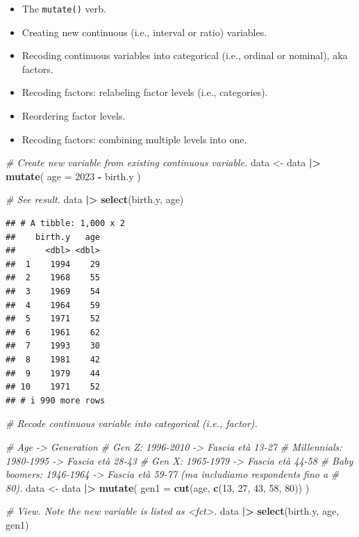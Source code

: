 \documentclass[
]{book}
\newenvironment{Shaded}{\begin{snugshade}}{\end{snugshade}}
\newcommand{\AttributeTok}[1]{\textcolor[rgb]{0.13,0.29,0.53}{#1}}
\newcommand{\CommentTok}[1]{\textcolor[rgb]{0.56,0.35,0.01}{\textit{#1}}}
\newcommand{\DecValTok}[1]{\textcolor[rgb]{0.00,0.00,0.81}{#1}}
\newcommand{\FunctionTok}[1]{\textcolor[rgb]{0.13,0.29,0.53}{\textbf{#1}}}
\newcommand{\NormalTok}[1]{#1}
\newcommand{\OtherTok}[1]{\textcolor[rgb]{0.56,0.35,0.01}{#1}}
\newcommand{\SpecialCharTok}[1]{\textcolor[rgb]{0.81,0.36,0.00}{\textbf{#1}}}
\providecommand{\tightlist}{%
  \setlength{\itemsep}{0pt}\setlength{\parskip}{0pt}}
\begin{document}
\begin{itemize}
\tightlist
\item
  The \texttt{mutate()} verb.
\item
  Creating new continuous (i.e., interval or ratio) variables.
\item
  Recoding continuous variables into categorical (i.e., ordinal or nominal), aka factors.
\item
  Recoding factors: relabeling factor levels (i.e., categories).
\item
  Reordering factor levels.
\item
  Recoding factors: combining multiple levels into one.
\end{itemize}

\begin{Shaded}
\begin{Highlighting}[]
\CommentTok{\# Create new variable from existing continuous variable.}
\NormalTok{data }\OtherTok{\textless{}{-}}\NormalTok{ data }\SpecialCharTok{|\textgreater{}} 
  \FunctionTok{mutate}\NormalTok{(}
    \AttributeTok{age =} \DecValTok{2023} \SpecialCharTok{{-}}\NormalTok{ birth.y}
\NormalTok{  )}

\CommentTok{\# See result.}
\NormalTok{data }\SpecialCharTok{|\textgreater{}} 
  \FunctionTok{select}\NormalTok{(birth.y, age)}
\end{Highlighting}
\end{Shaded}

\begin{verbatim}
## # A tibble: 1,000 x 2
##    birth.y   age
##      <dbl> <dbl>
##  1    1994    29
##  2    1968    55
##  3    1969    54
##  4    1964    59
##  5    1971    52
##  6    1961    62
##  7    1993    30
##  8    1981    42
##  9    1979    44
## 10    1971    52
## # i 990 more rows
\end{verbatim}

\begin{Shaded}
\begin{Highlighting}[]
\CommentTok{\# Recode continuous variable into categorical (i.e., factor).}

\CommentTok{\# Age {-}\textgreater{} Generation}
\CommentTok{\# Gen Z: 1996{-}2010 {-}\textgreater{} Fascia età 13{-}27}
\CommentTok{\# Millennials: 1980{-}1995 {-}\textgreater{} Fascia età 28{-}43}
\CommentTok{\# Gen X: 1965{-}1979 {-}\textgreater{} Fascia età 44{-}58}
\CommentTok{\# Baby boomers: 1946{-}1964 {-}\textgreater{} Fascia età 59{-}77 (ma includiamo respondents fino a }
\CommentTok{\# 80).}
\NormalTok{data }\OtherTok{\textless{}{-}}\NormalTok{ data }\SpecialCharTok{|\textgreater{}} 
  \FunctionTok{mutate}\NormalTok{(}
    \AttributeTok{gen1 =} \FunctionTok{cut}\NormalTok{(age, }\FunctionTok{c}\NormalTok{(}\DecValTok{13}\NormalTok{, }\DecValTok{27}\NormalTok{, }\DecValTok{43}\NormalTok{, }\DecValTok{58}\NormalTok{, }\DecValTok{80}\NormalTok{))}
\NormalTok{  )}

\CommentTok{\# View. Note the new variable is listed as \textless{}fct\textgreater{}.}
\NormalTok{data }\SpecialCharTok{|\textgreater{}} 
  \FunctionTok{select}\NormalTok{(birth.y, age, gen1)}
\end{Highlighting}
\end{Shaded}
\end{document}
